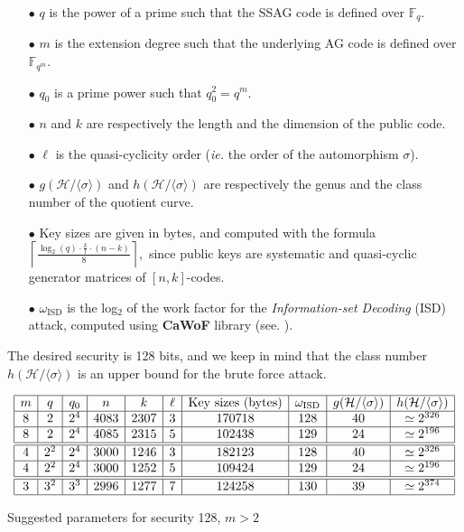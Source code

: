 \documentclass[10pt]{article}
\theoremstyle{definition}
\theoremstyle{definition}
\theoremstyle{definition}
\newcommand{\cd}{\cdot}
\newcommand{\calH}{\mathcal{H}}
\newcommand{\Fqm}{\mathbb{F}_{q^m}}
\newcommand{\Fq}{\mathbb{F}_q}
\newcommand{\w}{\omega}
\begin{document}
\begin{enumerate}
\item[$\bullet$] $q$ is the power of a prime such that the SSAG code is defined over $\Fq$.
\item[$\bullet$] $m$ is the extension degree such that the underlying AG code is defined over $\Fqm$.
\item[$\bullet$] $q_0$ is a prime power such that $q_0^2=q^m$.
\item[$\bullet$] $n$ and $k$ are respectively the length and the dimension of the public code.
\item[$\bullet$] $\ell$ is the quasi-cyclicity order (\textit{ie.} the order of the automorphism $\sigma$).  
\item[$\bullet$] $g(\calH/\langle \sigma \rangle)$ and $h(\calH/\langle \sigma \rangle)$ are respectively the genus and the class number of the quotient curve.
\item[$\bullet$] Key sizes are given in bytes, and computed with the formula $\left\lceil \frac{\log_{2}(q) \cd \frac{k}{l} \cd (n-k)}{8} \right\rceil,$ since public keys are systematic and quasi-cyclic generator matrices of $[n,k]$-codes.
\item[$\bullet$] $\w_{\mathrm{ISD}}$ is the log$_2$ of the work factor for the \textit{Information-set Decoding} (ISD) attack, computed using \textbf{CaWoF} library (see. \cite{CAWOF}).
\end{enumerate}
The desired security is 128 bits, and we keep in mind that the class number $h(\calH/\langle \sigma \rangle)$ is an upper bound for the brute force attack. 

\begin{table}[htbp]
\begin{equation*}
\begin{array}{|c|c|c|c|c|c|c|c|c|c|}
\hline
m & q & q_0 & n & k & \ell & \mathrm{Key} \ \mathrm{sizes} \ (\mathrm{bytes}) & \w_{\mathrm{ISD}} & g(\calH/\langle \sigma \rangle) & h(\calH/\langle \sigma \rangle) \\
\hline
8 & 2 & 2^4 & 4083 & 2307 & 3 & 170718 & 128 & 40 & \simeq 2^{326} \\
\hline
8 & 2 & 2^4 & 4085 & 2315 & 5 & 102438 & 129 & 24 & \simeq 2^{196} \\
\hline \hline
4 & 2^2 & 2^4 & 3000 & 1246 & 3 & 182123 & 128 & 40 & \simeq 2^{326} \\
\hline
4 & 2^2 & 2^4 & 3000 & 1252 & 5 & 109424 & 129 & 24 & \simeq 2^{196} \\
\hline \hline
3 & 3^2 & 3^3 & 2996 & 1277 & 7 & 124258 & 130 & 39 & \simeq 2^{374} \\
\hline
\end{array}
\end{equation*}
\caption{Suggested parameters for security 128, $m > 2$}
\end{table}
\end{document}

